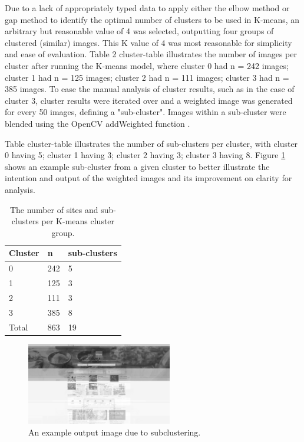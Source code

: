 \documentclass[conference]{IEEEtran}
\begin{document}
Due to a lack of appropriately typed data to apply either the elbow method \cite{elbow} or gap method \cite{gap} to identify the optimal number of clusters to be used in K-means, an arbitrary but reasonable value of 4 was selected, outputting four groups of clustered (similar) images. This K value of 4 was most reasonable for simplicity and ease of evaluation. Table 2 {cluster-table} illustrates the number of images per cluster after running the K-means model, where cluster 0 had n = 242 images; cluster 1 had n = 125 images; cluster 2 had n = 111 images; cluster 3 had n = 385 images. To ease the manual analysis of cluster results, such as in the case of cluster 3, cluster results were iterated over and a weighted image was generated for every 50 images, defining a "sub-cluster". Images within a sub-cluster were blended using the OpenCV addWeighted function \cite{cv2addweighted}.

Table {cluster-table} illustrates the number of sub-clusters per cluster, with cluster 0 having 5; cluster 1 having 3; cluster 2 having 3; cluster 3 having 8. Figure \ref{fig:subcluster} shows an example sub-cluster from a given cluster to better illustrate the intention and output of the weighted images and its improvement on clarity for analysis.

\begin{table}[]
\caption{The number of sites and sub-clusters per K-means cluster group.}
\label{tab:my-table}
\begin{tabular}{@{}lll@{}}
\toprule
Cluster & n  & sub-clusters \\ \midrule
0    & 242 & 5      \\
1    & 125 & 3      \\
2    & 111 & 3      \\
3    & 385 & 8      \\ \bottomrule
Total & 863 & 19     \\ \bottomrule
\end{tabular}
\end{table}

\begin{figure}[!t]
\centering
\label{fig:subcluster}
\includegraphics[width=2.5in]{media/subcluster2.png}
\caption{An example output image due to subclustering.}
\end{figure}
\end{document}
